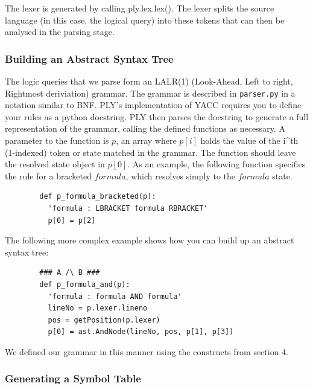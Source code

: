 \documentclass[a4paper, 11pt]{article}
\begin{document}
      The lexer is generated by calling ply.lex.lex(). The lexer splits the
      source language (in this case, the logical query) into these tokens that
      can then be analysed in the parsing stage.

      \subsubsection{Building an Abstract Syntax Tree}

      The logic queries that we parse form an LALR(1) (Look-Ahead, Left to
      right, Rightmost deriviation) grammar\cite{sittingacrossthere}. The
      grammar is described in \texttt{parser.py} in a notation similar to BNF.
      PLY's implementation of YACC requires you to define your rules as a
      python docstring. PLY then parses the docstring to generate a full
      representation of the grammar, calling the defined functions as
      necessary. A parameter to the function is $p$, an array where $p[i]$
      holds the value of the i^{th} (1-indexed) token or state matched in the
      grammar. The function should leave the resolved state object in $p[0]$.
      As an example, the following function specifies the rule for a bracketed
      $formula$, which resolves simply to the $formula$ state. 
      \begin{verbatim}
        def p_formula_bracketed(p):
          'formula : LBRACKET formula RBRACKET'
          p[0] = p[2]
      \end{verbatim}

      The following more complex example shows how you can build up an abstract
      syntax tree:

      \begin{verbatim}
        ### A /\ B ###
        def p_formula_and(p):
          'formula : formula AND formula'
          lineNo = p.lexer.lineno
          pos = getPosition(p.lexer)
          p[0] = ast.AndNode(lineNo, pos, p[1], p[3])
       \end{verbatim}

       We defined our grammar in this manner using the constructs from section 4.

    \subsubsection{Generating a Symbol Table}

\end{document}

